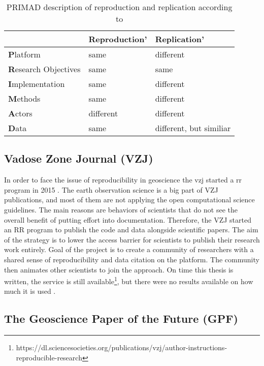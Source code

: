 \documentclass[draft,final]{vutinfth} %
\begin{document}
\begin{table}[]
	\caption{PRIMAD description of reproduction and replication according to \cite{Ostermann2017AdvancingSW}}
	\begin{tabular}{l|l|l}
		 & \textbf{Reproduction'} & \textbf{Replication'}  \\ \hline
		\textbf{P}latform & same & different \\ \hline 
		\textbf{R}esearch Objectives & same & same \\ \hline  
		\textbf{I}mplementation  & same & different  \\ \hline  
		\textbf{M}ethods & same & different \\ \hline 
		\textbf{A}ctors & different & different \\ \hline
		\textbf{D}ata & same & different, but similiar \\ \hline
	\end{tabular}
	\label{Tab:geoprimad}
\end{table}

\subsection{Vadose Zone Journal (VZJ)}\label{VZJ}
In order to face the issue of reproducibility in geoscience the \gls{vzj} started a \gls{rr} program in 2015 \cite{doi:10.2136/vzj2015.06.0088}. 
The earth observation science is a big part of VZJ publications, and most of them are not applying the open computational science guidelines. The main reasons are behaviors of scientists that do not see the overall benefit of putting effort into documentation. Therefore, the VZJ started an RR program to publish the code and data alongside scientific papers. The aim of the strategy is to lower the access barrier for scientists to publish their research work entirely. Goal of the project is to create a community of researchers with a shared sense of reproducibility and data citation on the platform. The community then animates other scientists to join the approach. On time this thesis is written, the service is still available\footnote{https://dl.sciencesocieties.org/publications/vzj/author-instructions-reproducible-research}, but there were no results available on how much it is used \cite{doi:10.2136/vzj2015.06.0088}.

\subsection{The Geoscience Paper of the Future (GPF)}\label{GPF}
\end{document}
